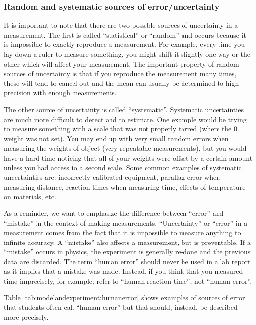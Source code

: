 \subsubsection{Random and systematic sources of error/uncertainty}
It is important to note that there are two possible sources of uncertainty in a measurement. The first is called ``statistical'' or ``random'' and occurs because it is impossible to exactly reproduce a measurement. For example, every time you lay down a ruler to measure something, you might shift it slightly one way or the other which will affect your measurement. The important property of random sources of uncertainty is that if you reproduce the measurement many times, these will tend to cancel out and the mean can usually be determined to high precision with enough measurements. 

The other source of uncertainty is called ``systematic''. Systematic uncertainties are much more difficult to detect and to estimate. One example would be trying to measure something with a scale that was not properly tarred (where the 0 weight was not set). You may end up with very small random errors when measuring the weights of object (very repeatable measurements), but you would have a hard time noticing that all of your weights were offset by a certain amount unless you had access to a second scale. Some common examples of systematic uncertainties are: incorrectly calibrated equipment, parallax error when measuring distance, reaction times when measuring time, effects of temperature on materials, etc.

As a reminder, we want to emphasize the difference between ``error'' and ``mistake'' in the context of making measurements. ``Uncertainty'' or ``error'' in a measurement comes from the fact that it is impossible to measure anything to infinite accuracy. A ``mistake'' also affects a measurement, but is preventable. If a ``mistake'' occurs in physics, the experiment is generally re-done and the previous data are discarded. The term ``human error'' should never be used in a lab report as it implies that a mistake was made. Instead, if you think that you measured time imprecisely, for example, refer to ``human reaction time'', not ``human error''.

Table \ref{tab:modelandexperiment:humanerror} shows examples of sources of error that students often call ``human error'' but that should, instead, be described more precisely.

